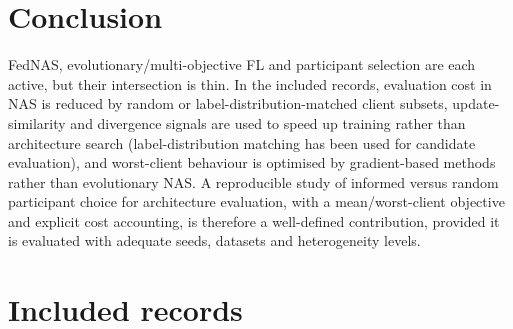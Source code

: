 \documentclass[11pt,a4paper]{article}
\begin{document}
\section{Conclusion}
FedNAS, evolutionary/multi-objective FL and participant selection are each active, but their intersection is thin. In the \nN{} included records, evaluation cost in NAS is reduced by random or label-distribution-matched client subsets, update-similarity and divergence signals are used to speed up training rather than architecture search (label-distribution matching has been used for candidate evaluation), and worst-client behaviour is optimised by gradient-based methods rather than evolutionary NAS. A reproducible study of informed versus random participant choice for architecture evaluation, with a mean/worst-client objective and explicit cost accounting, is therefore a well-defined contribution, provided it is evaluated with adequate seeds, datasets and heterogeneity levels.

\appendix
\section{Included records}




\end{document}
